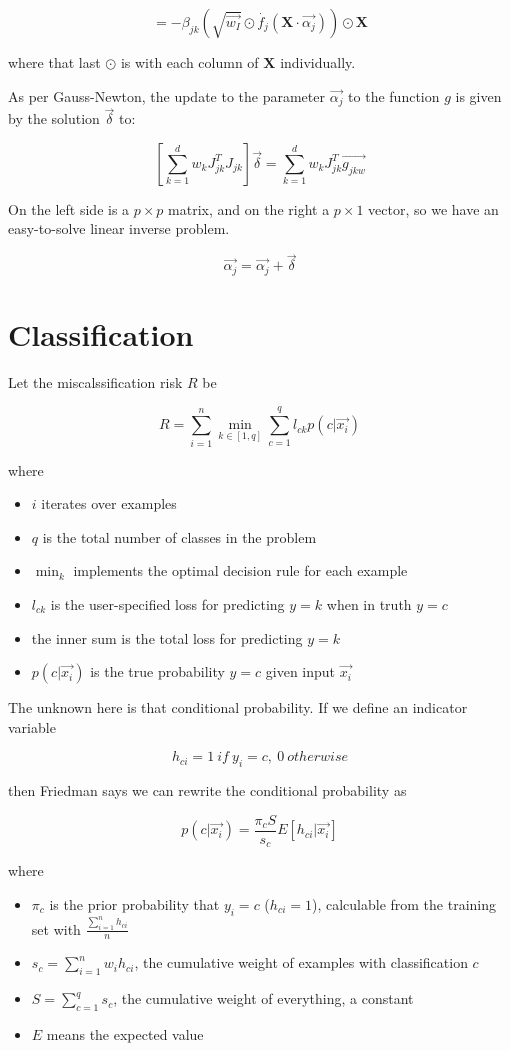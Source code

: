 \documentclass[12pt]{article}
\begin{document}
$$= -\beta_{jk} (\sqrt{\vec{w_I}} \odot \dot{f_j}(\pmb{X} \cdot \vec{\alpha_j})) \odot \pmb{X}$$

where that last $\odot$ is with each column of $\pmb{X}$ individually.\newline

As per Gauss-Newton, the update to the parameter $\vec{\alpha_j}$ to the function $g$ is given by the solution $\vec{\delta}$ to:

$$\left[ \sum_{k=1}^d w_k J_{jk}^T J_{jk} \right] \vec{\delta} = \sum_{k=1}^d w_k J_{jk}^T \vec{g_{jkw}}$$

On the left side is a $p \times p$ matrix, and on the right a $p \times 1$ vector, so we have an easy-to-solve linear inverse problem.

$$ \vec{\alpha_j} = \vec{\alpha_j} + \vec{\delta} $$

\section{Classification}

Let the miscalssification risk $R$ be

$$R = \sum_{i=1}^n \min_{k \in [1,q]} \sum_{c=1}^q l_{ck} p(c | \vec{x_i})$$

where
\begin{itemize}
	\setlength\itemsep{-2mm}
	\item $i$ iterates over examples
	\item $q$ is the total number of classes in the problem
	\item $\min_k$ implements the optimal decision rule for each example
	\item $l_{ck}$ is the user-specified loss for predicting $y=k$ when in truth $y=c$
	\item the inner sum is the total loss for predicting $y=k$
	\item $p(c | \vec{x_i})$ is the true probability $y=c$ given input $\vec{x_i}$
\end{itemize}

The unknown here is that conditional probability. If we define an indicator variable

$$h_{ci} = 1\ if\ y_i=c,\ 0\ otherwise$$

then Friedman says we can rewrite the conditional probability as

$$p(c | \vec{x_i}) = \frac{\pi_c S}{s_c} E[h_{ci} | \vec{x_i}]$$

where
\begin{itemize}
	\setlength\itemsep{-2mm}
	\item $\pi_c$ is the prior probability that $y_i=c$ ($h_{ci}=1$), calculable from the training set with $\frac{\sum_{i=1}^n h_{ci}}{n}$
	\item $s_c = \sum_{i=1}^n w_i h_{ci}$, the cumulative weight of examples with classification $c$
	\item $S = \sum_{c=1}^q s_c$, the cumulative weight of everything, a constant
	\item $E$ means the expected value
\end{itemize}
\end{document}
